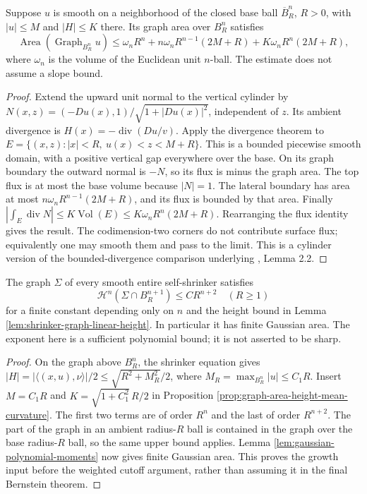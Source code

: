 \begin{proposition}\label{prop:graph-area-height-mean-curvature}
Suppose $u$ is smooth on a neighborhood of the closed base ball $\overline B_R^n$, $R>0$, with $|u|\leq M$ and $|H|\leq K$ there. Its graph area over $B_R^n$ satisfies
\[
 \operatorname{Area}(\operatorname{Graph}_{B_R^n}u)
 \leq\omega_nR^n+n\omega_nR^{n-1}(2M+R)
                    +K\omega_nR^n(2M+R),
\]
where $\omega_n$ is the volume of the Euclidean unit $n$-ball. The estimate does not assume a slope bound.
\end{proposition}
\begin{proof}
Extend the upward unit normal to the vertical cylinder by
$N(x,z)=(-Du(x),1)/\sqrt{1+|Du(x)|^2}$, independent of $z$. Its ambient divergence is $H(x)=-\operatorname{div}(Du/v)$. Apply the divergence theorem to
$E=\{(x,z):|x|<R,\ u(x)<z<M+R\}$.
This is a bounded piecewise smooth domain, with a positive vertical gap everywhere over the base. On its graph boundary the outward normal is $-N$, so its flux is minus the graph area. The top flux is at most the base volume because $|N|=1$. The lateral boundary has area at most $n\omega_nR^{n-1}(2M+R)$, and its flux is bounded by that area. Finally $|\int_E\operatorname{div}N|\leq K\operatorname{Vol}(E)\leq K\omega_nR^n(2M+R)$. Rearranging the flux identity gives the result. The codimension-two corners do not contribute surface flux; equivalently one may smooth them and pass to the limit. This is a cylinder version of the bounded-divergence comparison underlying \cite{Wang09}, Lemma 2.2.
\end{proof}

\begin{corollary}\label{cor:shrinker-graph-polynomial-area}
The graph $\Sigma$ of every smooth entire self-shrinker satisfies
\[
 \mathcal H^n(\Sigma\cap B_R^{n+1})\leq C R^{n+2}\quad(R\geq1)
\]
for a finite constant depending only on $n$ and the height bound in Lemma \ref{lem:shrinker-graph-linear-height}. In particular it has finite Gaussian area. The exponent here is a sufficient polynomial bound; it is not asserted to be sharp.
\end{corollary}
\begin{proof}
On the graph above $B_R^n$, the shrinker equation gives
$|H|=|\langle(x,u),\nu\rangle|/2\leq\sqrt{R^2+M_R^2}/2$,
where $M_R=\max_{B_R^n}|u|\leq C_1R$. Insert $M=C_1R$ and $K=\sqrt{1+C_1^2}\,R/2$ in Proposition \ref{prop:graph-area-height-mean-curvature}. The first two terms are of order $R^n$ and the last of order $R^{n+2}$. The part of the graph in an ambient radius-$R$ ball is contained in the graph over the base radius-$R$ ball, so the same upper bound applies. Lemma \ref{lem:gaussian-polynomial-moments} now gives finite Gaussian area. This proves the growth input before the weighted cutoff argument, rather than assuming it in the final Bernstein theorem.
\end{proof}

